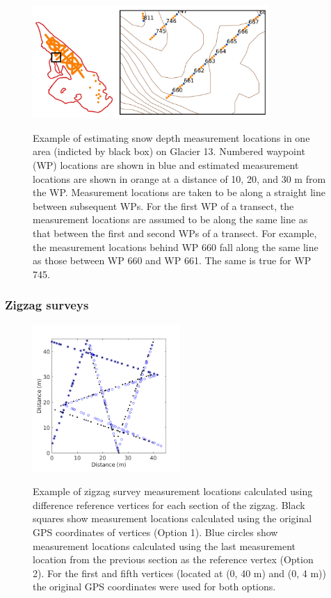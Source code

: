 \documentclass{sfuthesis}
\begin{document}
\begin{figure}[H]
	\centering
	\includegraphics[width = 0.8\textwidth]{transect_measure_locations.jpeg}\\
	\caption{Example of estimating snow depth measurement locations in one area (indicted by black box) on Glacier 13. Numbered waypoint (WP) locations are shown in blue and estimated measurement locations are shown in orange at a distance of 10, 20, and 30 m from the WP. Measurement locations are taken to be along a straight line between subsequent WPs. For the first WP of a transect, the measurement locations are assumed to be along the same line as that between the first and second WPs of a transect. For example, the measurement locations behind WP 660 fall along the same line as those between WP 660 and WP 661. The same is true for WP 745. }
	\label{fig:transect_measure_loc}
\end{figure}

\subsubsection{Zigzag surveys}

\begin{figure}
	\centering
	\includegraphics[width = 0.5\textwidth]{Zigzag_calOptions.png}\\
	\caption{Example of zigzag survey measurement locations calculated using difference reference vertices for each section of the zigzag. Black squares show measurement locations calculated using the original GPS coordinates of vertices (Option 1). Blue circles show measurement locations calculated using the last measurement location from the previous section as the reference vertex (Option 2). For the first and fifth vertices (located at (0, 40 m) and (0, 4 m)) the original GPS coordinates were used for both options. }
	\label{fig:zigzag_location_options}
\end{figure}
\end{document}
